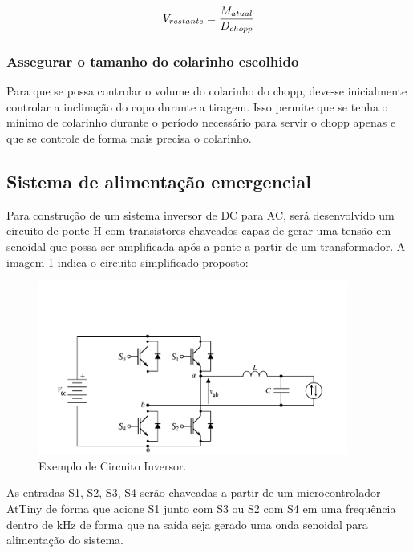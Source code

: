 				\begin{equation} 
					\label{eq2}
					V_{restante} = {M_{atual}\over D_{chopp}}
				\end{equation}				

			\subsubsection[Assegurar o tamanho do colarinho escolhido]{Assegurar o tamanho do colarinho escolhido}
				Para que se possa controlar o volume do colarinho do chopp, deve-se inicialmente controlar a 
				inclinação do copo durante a tiragem. Isso permite que se tenha o mínimo de colarinho durante o 
				período necessário para servir o chopp apenas e que se controle de forma mais precisa o colarinho.

		\subsection[Sistema de alimentação emergencial]{Sistema de alimentação emergencial}

			Para construção de um sistema inversor de DC para AC, será desenvolvido um circuito de ponte H com 
			transistores chaveados capaz de gerar uma tensão em senoidal que possa ser amplificada após a ponte a 
			partir de um transformador. A imagem \ref{circuito-inversor} indica o circuito simplificado proposto:

			\begin{figure}[H]
				\centering
				\includegraphics[scale= 0.7]{figuras/circuito-inversor.png}
				\caption{Exemplo de Circuito Inversor.}
				\label{circuito-inversor}
			\end{figure}

			As entradas S1, S2, S3, S4 serão chaveadas a partir de um microcontrolador AtTiny de forma que acione S1 
			junto com S3 ou S2 com S4 em uma frequência dentro de kHz de forma que na saída seja gerado uma onda 
			senoidal para alimentação do sistema.

